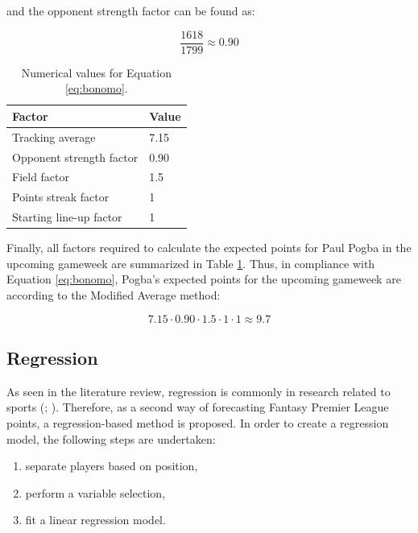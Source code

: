 and the opponent strength factor can be found as:

\begin{equation*}
    \frac{1618}{1799} \approx 0.90
\end{equation*}

\begin{table}[H]
\centering
\begin{tabular}{|l|l|}
\hline
Factor   &  Value \\ 
            \hline
Tracking average \Tstrut &  7.15\\
Opponent strength factor & 0.90\\
Field factor  &  1.5 \\
Points streak factor  & 1 \\
Starting line-up factor \Bstrut & 1\\
\hline
\end{tabular}
\caption{Numerical values for Equation \ref{eq:bonomo}.}
\label{tab:example_modified_average}
\end{table}

Finally, all factors required to calculate the expected points for Paul Pogba in the upcoming gameweek are summarized in Table \ref{tab:example_modified_average}. Thus, in compliance with Equation \ref{eq:bonomo}, Pogba's expected points for the upcoming gameweek are according to the Modified Average method:

\begin{equation*} \label{eq:pogba_ma}
    7.15 \cdot 0.90 \cdot 1.5 \cdot 1 \cdot 1 \approx 9.7
\end{equation*}




\subsection{Regression}
\label{Sol_approach_regression}

As seen in the literature review, regression is commonly in research related to sports (\cite{vabo}; \cite{Yang}). Therefore, as a second way of forecasting Fantasy Premier League points, a regression-based method is proposed. In order to create a regression model, the following steps are undertaken:

\begin{enumerate} [label=(\roman*)]
    \item separate players based on position,
    \item perform a variable selection,
    \item fit a linear regression model.
\end{enumerate}

